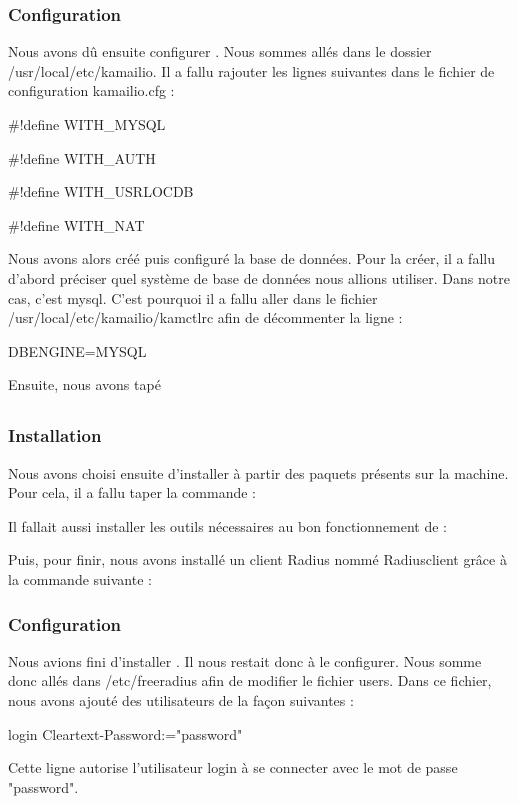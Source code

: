 \subsubsection{Configuration}

Nous avons dû ensuite configurer \kam. Nous sommes allés dans le dossier /usr/local/etc/kamailio. Il a fallu rajouter les lignes suivantes dans le fichier de configuration kamailio.cfg :

\#!define WITH\_MYSQL

\#!define WITH\_AUTH

\#!define WITH\_USRLOCDB

\#!define WITH\_NAT

Nous avons alors créé puis configuré la base de données. Pour la créer, il a fallu d'abord préciser quel système de base de données nous allions utiliser.
Dans notre cas, c'est mysql. C'est pourquoi il a fallu aller dans le fichier /usr/local/etc/kamailio/kamctlrc afin de décommenter la ligne :

DBENGINE=MYSQL

Ensuite, nous avons tapé 
\todo

\subsection{\frad}
\subsubsection{Installation}

Nous avons choisi ensuite d'installer \frad à partir des paquets présents sur la machine. Pour cela, il a fallu taper la commande :


Il fallait aussi installer les outils nécessaires au bon fonctionnement de \frad :


Puis, pour finir, nous avons installé un client Radius nommé Radiusclient grâce à la commande suivante :


\subsubsection{Configuration}
Nous avions fini d'installer \frad. Il nous restait donc à le configurer. Nous somme donc allés dans /etc/freeradius afin de modifier le fichier users. Dans ce fichier, nous avons ajouté des utilisateurs de la façon suivantes :

login Cleartext-Password:="password"

Cette ligne autorise l'utilisateur login à se connecter avec le mot de passe "password".






